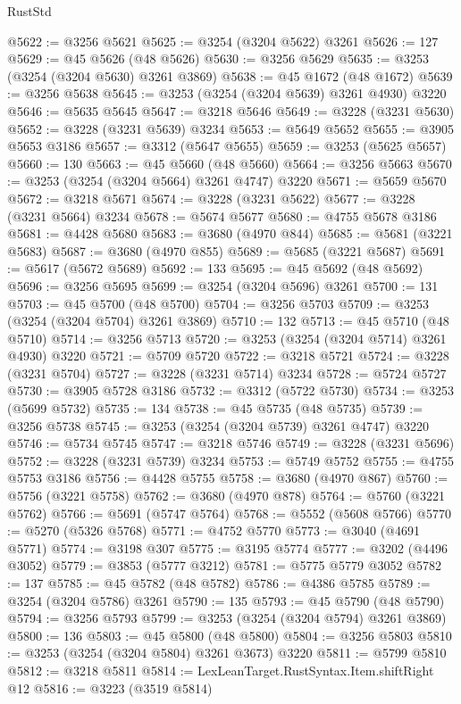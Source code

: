 \begin{lexlean}{RustStd}
\begin{coremodule}
@5622 := @3256 @5621
@5625 := @3254 (@3204 @5622) @3261
@5626 := 127
@5629 := @45 @5626 (@48 @5626)
@5630 := @3256 @5629
@5635 := @3253 (@3254 (@3204 @5630) @3261 @3869)
@5638 := @45 @1672 (@48 @1672)
@5639 := @3256 @5638
@5645 := @3253 (@3254 (@3204 @5639) @3261 @4930) @3220
@5646 := @5635 @5645
@5647 := @3218 @5646
@5649 := @3228 (@3231 @5630)
@5652 := @3228 (@3231 @5639) @3234
@5653 := @5649 @5652
@5655 := @3905 @5653 @3186
@5657 := @3312 (@5647 @5655)
@5659 := @3253 (@5625 @5657)
@5660 := 130
@5663 := @45 @5660 (@48 @5660)
@5664 := @3256 @5663
@5670 := @3253 (@3254 (@3204 @5664) @3261 @4747) @3220
@5671 := @5659 @5670
@5672 := @3218 @5671
@5674 := @3228 (@3231 @5622)
@5677 := @3228 (@3231 @5664) @3234
@5678 := @5674 @5677
@5680 := @4755 @5678 @3186
@5681 := @4428 @5680
@5683 := @3680 (@4970 @844)
@5685 := @5681 (@3221 @5683)
@5687 := @3680 (@4970 @855)
@5689 := @5685 (@3221 @5687)
@5691 := @5617 (@5672 @5689)
@5692 := 133
@5695 := @45 @5692 (@48 @5692)
@5696 := @3256 @5695
@5699 := @3254 (@3204 @5696) @3261
@5700 := 131
@5703 := @45 @5700 (@48 @5700)
@5704 := @3256 @5703
@5709 := @3253 (@3254 (@3204 @5704) @3261 @3869)
@5710 := 132
@5713 := @45 @5710 (@48 @5710)
@5714 := @3256 @5713
@5720 := @3253 (@3254 (@3204 @5714) @3261 @4930) @3220
@5721 := @5709 @5720
@5722 := @3218 @5721
@5724 := @3228 (@3231 @5704)
@5727 := @3228 (@3231 @5714) @3234
@5728 := @5724 @5727
@5730 := @3905 @5728 @3186
@5732 := @3312 (@5722 @5730)
@5734 := @3253 (@5699 @5732)
@5735 := 134
@5738 := @45 @5735 (@48 @5735)
@5739 := @3256 @5738
@5745 := @3253 (@3254 (@3204 @5739) @3261 @4747) @3220
@5746 := @5734 @5745
@5747 := @3218 @5746
@5749 := @3228 (@3231 @5696)
@5752 := @3228 (@3231 @5739) @3234
@5753 := @5749 @5752
@5755 := @4755 @5753 @3186
@5756 := @4428 @5755
@5758 := @3680 (@4970 @867)
@5760 := @5756 (@3221 @5758)
@5762 := @3680 (@4970 @878)
@5764 := @5760 (@3221 @5762)
@5766 := @5691 (@5747 @5764)
@5768 := @5552 (@5608 @5766)
@5770 := @5270 (@5326 @5768)
@5771 := @4752 @5770
@5773 := @3040 (@4691 @5771)
@5774 := @3198 @307
@5775 := @3195 @5774
@5777 := @3202 (@4496 @3052)
@5779 := @3853 (@5777 @3212)
@5781 := @5775 @5779 @3052
@5782 := 137
@5785 := @45 @5782 (@48 @5782)
@5786 := @4386 @5785
@5789 := @3254 (@3204 @5786) @3261
@5790 := 135
@5793 := @45 @5790 (@48 @5790)
@5794 := @3256 @5793
@5799 := @3253 (@3254 (@3204 @5794) @3261 @3869)
@5800 := 136
@5803 := @45 @5800 (@48 @5800)
@5804 := @3256 @5803
@5810 := @3253 (@3254 (@3204 @5804) @3261 @3673) @3220
@5811 := @5799 @5810
@5812 := @3218 @5811
@5814 := LexLeanTarget.RustSyntax.Item.shiftRight @12
@5816 := @3223 (@3519 @5814)

\end{coremodule}
\end{lexlean}
